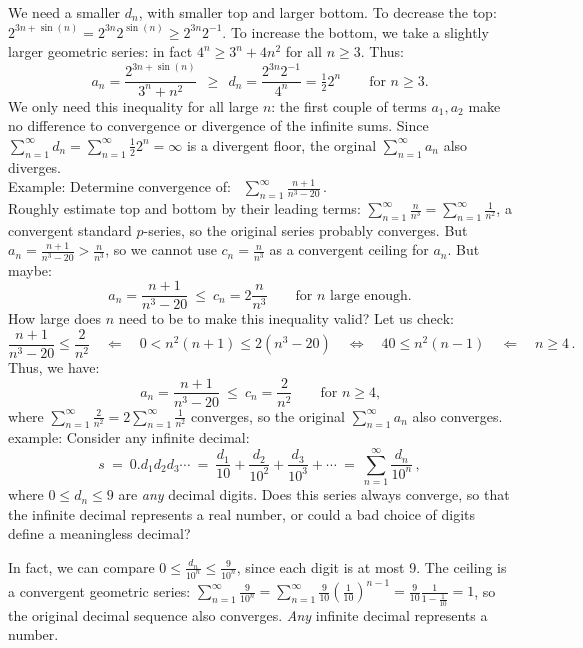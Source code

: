 \documentclass[11pt]{article}
\newcommand{\ds}{\displaystyle}
\begin{document}
We need a smaller $d_n$, with smaller top and larger bottom. 
To decrease the top: $2^{3n+\sin(n)}=
2^{3n}2^{\sin(n)}\geq 2^{3n}2^{-1}$.
To increase the bottom, we take a slightly larger geometric series:
in fact
$4^n\geq 3^n+4n^2$ for all $n\geq 3$.
Thus:
$$
a_n = \frac{2^{3n+\sin(n)}}{3^n + n^2}
\ \ \geq\ \ 
d_n = \frac{2^{3n}2^{-1}}{4^n}
=\tfrac12 2^n 
\qquad\text{for $n\geq 3$.}
$$
We only need this inequality for all large $n$: 
the first couple of terms $a_1, a_2$ make no difference 
to convergence or divergence of the infinite sums.
Since $\sum_{n=1}^\infty d_n = \sum_{n=1}^\infty\tfrac12 2^n=\infty$ is a divergent floor, 
the orginal $\sum_{n=1}^\infty a_n$ also diverges.
\\[.5em]
{\sc Example:} Determine convergence of: \  
$\ds\sum\limits_{n=1}^\infty \frac{n+1}{n^3 - 20}$\,.
\\
Roughly estimate top and bottom by their leading terms:
$\sum_{n=1}^\infty\frac{n}{n^3}=\sum_{n=1}^\infty\frac{1}{n^2}$, a convergent standard $p$-series,
so the original series probably converges.
But $a_n=\frac{n+1}{n^3-20}>\frac n{n^3}$, so we cannot use $c_n=\frac n{n^3}$ as a convergent ceiling for $a_n$.
But maybe:
$$
a_n=\frac{n+1}{n^3-20}\ \leq\ c_n=2\frac{n}{n^3} \qquad
\text{for $n$ large enough.}
$$
How large does $n$ need to be to make this inequality valid?
Let us check:
$$
\frac{n+1}{n^3-20}\leq\frac2{n^2}
\quad\Longleftarrow\quad
0<n^2(n+1)\leq 2(n^3-20)
\quad\Longleftrightarrow\quad
40\leq n^2(n{-}1)
\quad\Longleftarrow\quad
n\geq 4\,.
$$
Thus, we have:
$$
a_n=\frac{n+1}{n^3-20}\ \leq\ c_n = \frac2{n^2} \qquad
\text{for $n\geq 4$,}
$$
where $\sum_{n=1}^\infty\frac{2}{n^2} = 2\sum_{n=1}^\infty\frac{1}{n^2}$ converges,
so the original $\sum_{n=1}^\infty a_n$ also converges.
\\[.5em]
{\sc example:} Consider any infinite decimal:
$$
s \ =\ 0.d_1d_2d_3\cdots \ =\ \frac{d_1}{10}+\frac{d_2}{10^2}+\frac{d_3}{10^3}+\cdots
\ =\ \sum\limits_{n=1}^\infty \frac{d_n}{10^n}\,,
$$
where $0\leq d_n\leq 9$ are {\it any} decimal digits. Does this series always converge,
so that the infinite decimal represents a real number, or could a bad choice of digits define a meaningless decimal? 

In fact, we can compare $0\leq \frac{d_n}{10^n}\leq \frac{9}{10^n}$, 
since each digit is at most 9.
The ceiling is a convergent geometric series: $\sum_{n=1}^\infty \frac{9}{10^n} =\sum_{n=1}^\infty \frac9{10}\left(\frac1{10}\right)^{\!n-1} = \frac{9}{10}\frac{1}{1-\frac1{10}}=1$, so the original decimal sequence also converges.
{\it Any} infinite decimal represents a number.
\end{document}
